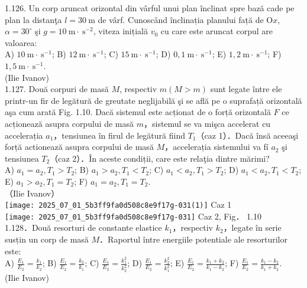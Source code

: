 1.126. Un corp aruncat orizontal din vârful unui plan înclinat spre bază cade pe plan la distanţa $l=30 \mathrm{~m}$ de vârf. Cunoscând înclinația planului față de $\mathrm{O} x$, $\alpha=30^{\circ}$ şi $g=10 \mathrm{~m} \cdot \mathrm{~s}^{-2}$, viteza inițială $v_{0}$ cu care este aruncat corpul are valoarea:\\ A) $10 \mathrm{~m} \cdot \mathrm{~s}^{-1}$; B) $12 \mathrm{~m} \cdot \mathrm{~s}^{-1}$; C) $15 \mathrm{~m} \cdot \mathrm{~s}^{-1}$; D) $0,1 \mathrm{~m} \cdot \mathrm{~s}^{-1}$; E) $1,2 \mathrm{~m} \cdot \mathrm{~s}^{-1}$; F) $1,5 \mathrm{~m} \cdot \mathrm{~s}^{-1}$.\\ (Ilie Ivanov)\\

1.127. Două corpuri de masă $M$, respectiv $m (M>m)$ sunt legate între ele printr-un fir de legătură de greutate neglijabilă şi se află pe o suprafață orizontală aşa cum arată Fig. 1.10. Dacă sistemul este acționat de o forță orizontală $F$ ce acționează asupra corpului de masă $m$，sistemul se va mişca accelerat cu accelerația $a_{1}$，tensiunea în firul de legătură fiind $T_{1}$（caz 1）．Dacă însă aceeaşi forță actionează asupra corpului de masă $M$，accelerația sistemului va fí $a_{2}$ şi tensiunea $T_{2}$（caz 2）．În aceste condiții, care este relaţia dintre mărimi?\\ A) $a_{1}=a_{2}, T_{1}>T_{2}$; B) $a_{1}>a_{2}, T_{1}<T_{2}$; C) $a_{1}<a_{2}, T_{1}>T_{2}$; D) $a_{1}<a_{2}, T_{1}<T_{2}$; E) $a_{1}>a_{2}, T_{1}=T_{2}$; F) $a_{1}=a_{2}, T_{1}=T_{2}$.\\（Ilie Ivanov）\\ \texttt{[image: 2025\_07\_01\_5b3ff9fa0d508c8e9f17g-031(1)]} Caz 1\\ \texttt{[image: 2025\_07\_01\_5b3ff9fa0d508c8e9f17g-031]} Caz 2, Fig． 1.10\\

1.128．Două resorturi de constante elastice $k_{1}$，respectiv $k_{2}$，legate în serie susțin un corp de masă $M$．Raportul între energiile potentiale ale resorturilor este:\\ A) $\frac{E_{1}}{E_{2}}=\frac{k_{1}}{k_{2}}$; B) $\frac{E_{1}}{E_{2}}=\frac{k_{2}}{k_{1}}$; C) $\frac{E_{1}}{E_{2}}=\frac{k_{1}^{2}}{k_{2}^{2}}$; D) $\frac{E_{1}}{E_{2}}=\frac{k_{2}^{2}}{k_{1}^{2}}$; E) $\frac{E_{1}}{E_{2}}=\frac{k_{1}+k_{2}}{k_{1}-k_{2}}$; F) $\frac{E_{1}}{E_{2}}=\frac{k_{1}-k_{2}}{k_{1}+k_{2}}$.\\ (Ilie Ivanov)\\

